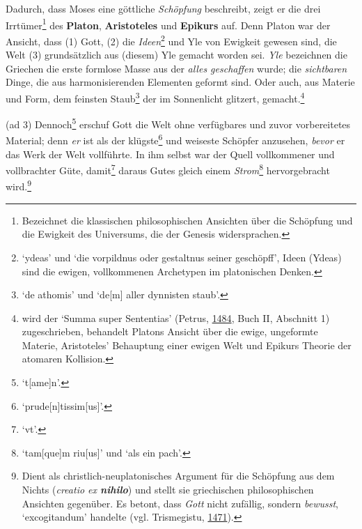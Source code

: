 \documentclass[
]{article}
\begin{document}
Dadurch, dass Moses eine göttliche \emph{Schöpfung} beschreibt, zeigt er
die drei Irrtümer\footnote{Bezeichnet die klassischen philosophischen
  Ansichten über die Schöpfung und die Ewigkeit des Universums, die der
  Genesis widersprachen.} des \textbf{Platon}, \textbf{Aristoteles} und
\textbf{Epikurs} auf. Denn Platon war der Ansicht, dass (1) Gott, (2)
die \emph{Ideen}\footnote{`ydeas' und `die vorpildnus oder gestaltnus
  seiner geschöpff', Ideen (Ydeas) sind die ewigen, vollkommenen
  Archetypen im platonischen Denken.} und Yle von Ewigkeit gewesen sind,
die Welt (3) grundsätzlich aus (diesem) Yle gemacht worden sei.
\emph{Yle} bezeichnen die Griechen die erste formlose Masse aus der
\emph{alles geschaffen} wurde; die \emph{sichtbaren} Dinge, die aus
harmonisierenden Elementen geformt sind. Oder auch, aus Materie und
Form, dem feinsten Staub\footnote{`de athomis' und `de{[}m{]} aller
  dynnisten staub'.} der im Sonnenlicht glitzert, gemacht.\footnote{wird
  der `Summa super Sententias' (Petrus,
  \href{https://doi.org/10.3931/e-rara-18241}{1484}, Buch II, Abschnitt
  1) zugeschrieben, behandelt Platons Ansicht über die ewige, ungeformte
  Materie, Aristoteles' Behauptung einer ewigen Welt und Epikurs Theorie
  der atomaren Kollision.}

(ad 3) Dennoch\footnote{`t{[}ame{]}n'.} erschuf Gott die Welt ohne
verfügbares und zuvor vorbereitetes Material; denn \emph{er} ist als der
klügste\footnote{`prude{[}n{]}tissim{[}us{]}'.} und weiseste Schöpfer
anzusehen, \emph{bevor} er das Werk der Welt vollführte. In ihm selbst war der
Quell vollkommener und vollbrachter Güte, damit\footnote{`vt'.} daraus
Gutes gleich einem \emph{Strom}\footnote{`tam{[}que{]}m riu{[}us{]}' und
  `als ein pach'.} hervorgebracht wird.\footnote{Dient als
  christlich-neuplatonisches Argument für die Schöpfung aus dem Nichts
  (\emph{creatio ex \textbf{nihilo}}) und stellt sie griechischen
  philosophischen Ansichten gegenüber. Es betont, dass \emph{Gott} nicht
  zufällig, sondern \emph{bewusst}, `excogitandum' handelte (vgl.
  Trismegistu,
  \href{https://gdz.sub.uni-goettingen.de/id/PPN858183994}{1471}).}
\end{document}
